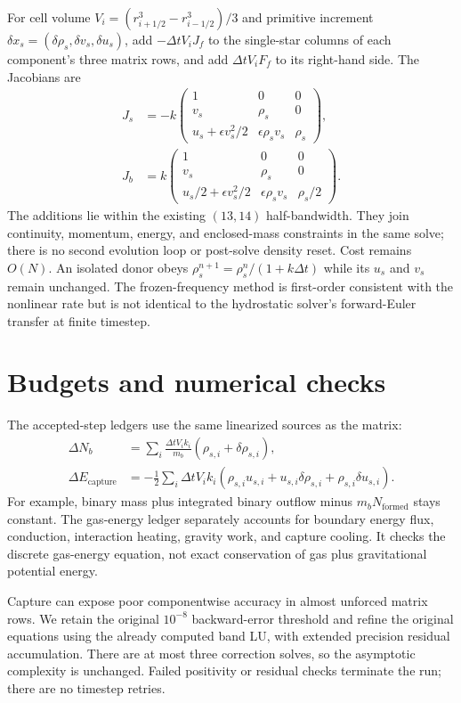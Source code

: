 \documentclass[11pt]{article}
\begin{document}
For cell volume $V_i=(r_{i+1/2}^3-r_{i-1/2}^3)/3$ and primitive increment
$\delta x_s=(\delta\rho_s,\delta v_s,\delta u_s)$, add
$-\Delta t V_i J_f$ to the single-star columns of each component's three
matrix rows, and add $\Delta t V_i F_f$ to its right-hand side. The Jacobians are
\begin{align}
 J_s&=-k\begin{pmatrix}
 1&0&0\\ v_s&\rho_s&0\\
 u_s+\epsilon v_s^2/2&\epsilon\rho_s v_s&\rho_s
 \end{pmatrix},\\
 J_b&=k\begin{pmatrix}
 1&0&0\\ v_s&\rho_s&0\\
 u_s/2+\epsilon v_s^2/2&\epsilon\rho_s v_s&\rho_s/2
 \end{pmatrix}.
\end{align}
The additions lie within the existing $(13,14)$ half-bandwidth. They join
continuity, momentum, energy, and enclosed-mass constraints in the same solve;
there is no second evolution loop or post-solve density reset. Cost remains
$O(N)$. An isolated donor obeys
$\rho_s^{n+1}=\rho_s^n/(1+k\Delta t)$ while its $u_s$ and $v_s$ remain unchanged.
The frozen-frequency method is first-order consistent with the nonlinear
rate but is not identical to the hydrostatic solver's forward-Euler transfer
at finite timestep.

\section{Budgets and numerical checks}
The accepted-step ledgers use the same linearized sources as the matrix:
\begin{align}
 \Delta N_b&=\sum_i\frac{\Delta t V_i k_i}{m_b}(\rho_{s,i}+\delta\rho_{s,i}),\\
 \Delta E_{\mathrm{capture}}&=-\frac12\sum_i\Delta t V_i k_i
 (\rho_{s,i}u_{s,i}+u_{s,i}\delta\rho_{s,i}+\rho_{s,i}\delta u_{s,i}).
\end{align}
For example, binary mass plus integrated binary outflow minus
$m_bN_{\mathrm{formed}}$ stays constant. The gas-energy ledger separately
accounts for boundary energy flux, conduction, interaction heating, gravity
work, and capture cooling. It checks the discrete gas-energy equation, not
exact conservation of gas plus gravitational potential energy.

Capture can expose poor componentwise accuracy in almost unforced matrix
rows. We retain the original $10^{-8}$ backward-error threshold and refine
the original equations using the already computed band LU, with extended
precision residual accumulation. There are at most three correction solves,
so the asymptotic complexity is unchanged. Failed positivity or residual
checks terminate the run; there are no timestep retries.
\end{document}
